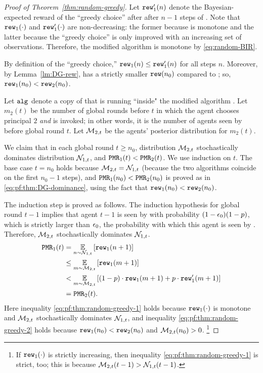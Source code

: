 \begin{proof}[Proof of Theorem~\ref{thm:random-greedy}]
  Let $\mathtt{rew}'_1(n)$ denote the Bayesian-expected reward of the ``greedy
  choice'' after after $n-1$ steps of \alg[1]. Note that
  $\mathtt{rew}_1(\cdot)$ and $\mathtt{rew}'_1(\cdot)$ are non-decreasing: the former
  because \alg[1] is monotone and the latter because the ``greedy
  choice'' is only improved with an increasing set of
  observations. Therefore, the modified algorithm \alg[2] is monotone
  by \eqref{eq:random-BIR}.

  By definition of the ``greedy choice,'' $\mathtt{rew}_1(n)\leq \mathtt{rew}'_1(n)$
  for all steps $n$. Moreover, by Lemma~\ref{lm:DG-rew},
  \alg[1] has a strictly smaller $\mathtt{rew}(n_0)$ compared to \DynGreedy;
  so, $\mathtt{rew}_1(n_0)<\mathtt{rew}_2(n_0)$.

Let $\mathtt{alg}_{}$ denote a copy of \alg[1] that is running ``inside" the modified algorithm \alg[2]. Let $m_2(t)$ be the number of global rounds before $t$ in which the agent chooses principal $2$ \emph{and} \alg is invoked; in other words, it is the number of agents seen by \alg before global round $t$. Let $\mathcal{M}_{2,t}$ be the agents' posterior distribution for $m_2(t)$.

We claim that in each global round $t\geq n_0$, distribution $\mathcal{M}_{2,t}$ stochastically dominates distribution $\mathcal{N}_{1,t}$, and $\mathtt{PMR}_1(t)<\mathtt{PMR}_2(t)$. We use induction on $t$. The base case $t=n_0$ holds because $\mathcal{M}_{2,t} = \mathcal{N}_{1,t}$ (because the two algorithms coincide on the first $n_0-1$ steps), and $\mathtt{PMR}_1(n_0)<\mathtt{PMR}_2(n_0)$ is proved as in \eqref{eq:pf:thm:DG-dominance}, using the fact that $\mathtt{rew}_1(n_0)<\mathtt{rew}_2(n_0)$.

The induction step is proved as follows. The induction hypothesis for global round $t-1$ implies that agent $t-1$ is seen by \alg with probability $(1-\epsilon_0)(1-p)$, which is strictly larger than $\epsilon_0$, the probability with which this agent is seen by \alg[2]. Therefore, $\mathcal{M}_{2,t}$ stochastically dominates $\mathcal{N}_{1,t}$.
\begin{align}
\mathtt{PMR}_1(t)
  &= \operatorname*{\mathbb{E}}_{n\sim \mathcal{N}_{1,t}}\left[\mathtt{rew}_1(n+1)\right] \nonumber \\
  &\leq \operatorname*{\mathbb{E}}_{m\sim \mathcal{M}_{2,t}}\left[\mathtt{rew}_1(m+1)\right]
    \label{eq:pf:thm:random-greedy-1}\\
  &< \operatorname*{\mathbb{E}}_{m\sim \mathcal{M}_{2,t}}\left[(1-p)\cdot \mathtt{rew}_1(m+1) + p\cdot \mathtt{rew}'_1(m+1)\right]
    \label{eq:pf:thm:random-greedy-2} \\
  &= \mathtt{PMR}_2(t). \nonumber
\end{align}
Here inequality \eqref{eq:pf:thm:random-greedy-1} holds because $\mathtt{rew}_1(\cdot)$ is monotone and $\mathcal{M}_{2,t}$ stochastically dominates $\mathcal{N}_{1,t}$, and inequality \eqref{eq:pf:thm:random-greedy-2} holds because $\mathtt{rew}_1(n_0)<\mathtt{rew}_2(n_0)$ and $\mathcal{M}_{2,t}(n_0)>0$.%
\footnote{If $\mathtt{rew}_1(\cdot)$ is strictly increasing, then inequality \eqref{eq:pf:thm:random-greedy-1} is strict, too; this is because $\mathcal{M}_{2,t}(t-1)>\mathcal{N}_{1,t}(t-1)$.  }
\end{proof}



